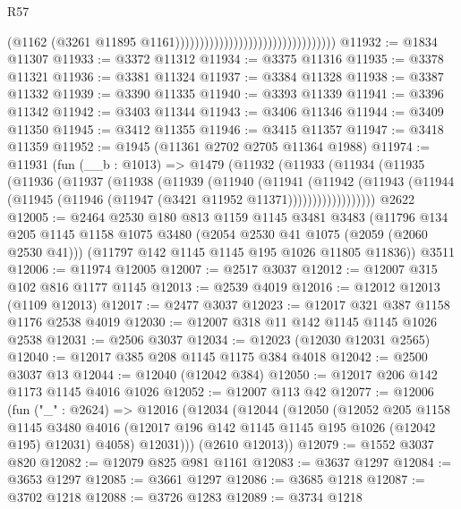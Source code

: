 \begin{lexlean}{R57}
\begin{coremodule}
                                                                  (@1162
                                                                    (@3261
                                                                      @11895
                                                                      @1161)))))))))))))))))))))))))))))))))
@11932 := @1834 @11307
@11933 := @3372 @11312
@11934 := @3375 @11316
@11935 := @3378 @11321
@11936 := @3381 @11324
@11937 := @3384 @11328
@11938 := @3387 @11332
@11939 := @3390 @11335
@11940 := @3393 @11339
@11941 := @3396 @11342
@11942 := @3403 @11344
@11943 := @3406 @11346
@11944 := @3409 @11350
@11945 := @3412 @11355
@11946 := @3415 @11357
@11947 := @3418 @11359
@11952 := @1945 (@11361 @2702 @2705 @11364 @1988)
@11974 := @11931
    (fun (__b : @1013) =>
    @1479
      (@11932
        (@11933
          (@11934
            (@11935
              (@11936
                (@11937
                  (@11938
                    (@11939
                      (@11940
                        (@11941
                          (@11942
                            (@11943
                              (@11944 (@11945 (@11946 (@11947 (@3421 @11952 @11371))))))))))))))))))
    @2622
@12005 := @2464
    @2530
    @180
    @813
    @1159
    @1145
    @3481
    @3483
    (@11796
      @134
      @205
      @1145
      @1158
      @1075
      @3480
      (@2054 @2530 @41 @1075 (@2059 (@2060 @2530 @41)))
      (@11797 @142 @1145 @1145 @195 @1026 @11805 @11836))
    @3511
@12006 := @11974 @12005
@12007 := @2517 @3037
@12012 := @12007 @315 @102 @816 @1177 @1145
@12013 := @2539 @4019
@12016 := @12012 @12013 (@1109 @12013)
@12017 := @2477 @3037
@12023 := @12017 @321 @387 @1158 @1176 @2538 @4019
@12030 := @12007 @318 @11 @142 @1145 @1145 @1026 @2538
@12031 := @2506 @3037
@12034 := @12023 (@12030 @12031 @2565)
@12040 := @12017 @385 @208 @1145 @1175 @384 @4018
@12042 := @2500 @3037 @13
@12044 := @12040 (@12042 @384)
@12050 := @12017 @206 @142 @1173 @1145 @4016 @1026
@12052 := @12007 @113 @42
@12077 := @12006
    (fun ("_" : @2624) =>
    @12016
      (@12034
        (@12044
          (@12050
            (@12052
              @205
              @1158
              @1145
              @3480
              @4016
              (@12017 @196 @142 @1145 @1145 @195 @1026 (@12042 @195) @12031)
              @4058)
            @12031)))
      (@2610 @12013))
@12079 := @1552 @3037 @820
@12082 := @12079 @825 @981 @1161
@12083 := @3637 @1297
@12084 := @3653 @1297
@12085 := @3661 @1297
@12086 := @3685 @1218
@12087 := @3702 @1218
@12088 := @3726 @1283
@12089 := @3734 @1218

\end{coremodule}
\end{lexlean}
